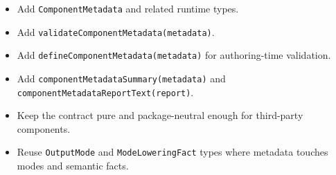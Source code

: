 \begin{itemize}
\tightlist
\item
  Add \texttt{C\allowbreak{}o\allowbreak{}m\allowbreak{}p\allowbreak{}o\allowbreak{}n\allowbreak{}e\allowbreak{}n\allowbreak{}t\allowbreak{}M\allowbreak{}e\allowbreak{}t\allowbreak{}a\allowbreak{}d\allowbreak{}a\allowbreak{}t\allowbreak{}a} and related runtime types.
\item
  Add \texttt{v\allowbreak{}a\allowbreak{}l\allowbreak{}i\allowbreak{}d\allowbreak{}a\allowbreak{}t\allowbreak{}e\allowbreak{}C\allowbreak{}o\allowbreak{}m\allowbreak{}p\allowbreak{}o\allowbreak{}n\allowbreak{}e\allowbreak{}n\allowbreak{}t\allowbreak{}M\allowbreak{}e\allowbreak{}t\allowbreak{}a\allowbreak{}d\allowbreak{}a\allowbreak{}t\allowbreak{}a\allowbreak{}(\allowbreak{}m\allowbreak{}e\allowbreak{}t\allowbreak{}a\allowbreak{}d\allowbreak{}a\allowbreak{}t\allowbreak{}a\allowbreak{})}.
\item
  Add \texttt{d\allowbreak{}e\allowbreak{}f\allowbreak{}i\allowbreak{}n\allowbreak{}e\allowbreak{}C\allowbreak{}o\allowbreak{}m\allowbreak{}p\allowbreak{}o\allowbreak{}n\allowbreak{}e\allowbreak{}n\allowbreak{}t\allowbreak{}M\allowbreak{}e\allowbreak{}t\allowbreak{}a\allowbreak{}d\allowbreak{}a\allowbreak{}t\allowbreak{}a\allowbreak{}(\allowbreak{}m\allowbreak{}e\allowbreak{}t\allowbreak{}a\allowbreak{}d\allowbreak{}a\allowbreak{}t\allowbreak{}a\allowbreak{})} for authoring-time validation.
\item
  Add \texttt{c\allowbreak{}o\allowbreak{}m\allowbreak{}p\allowbreak{}o\allowbreak{}n\allowbreak{}e\allowbreak{}n\allowbreak{}t\allowbreak{}M\allowbreak{}e\allowbreak{}t\allowbreak{}a\allowbreak{}d\allowbreak{}a\allowbreak{}t\allowbreak{}a\allowbreak{}S\allowbreak{}u\allowbreak{}m\allowbreak{}m\allowbreak{}a\allowbreak{}r\allowbreak{}y\allowbreak{}(\allowbreak{}m\allowbreak{}e\allowbreak{}t\allowbreak{}a\allowbreak{}d\allowbreak{}a\allowbreak{}t\allowbreak{}a\allowbreak{})} and \texttt{c\allowbreak{}o\allowbreak{}m\allowbreak{}p\allowbreak{}o\allowbreak{}n\allowbreak{}e\allowbreak{}n\allowbreak{}t\allowbreak{}M\allowbreak{}e\allowbreak{}t\allowbreak{}a\allowbreak{}d\allowbreak{}a\allowbreak{}t\allowbreak{}a\allowbreak{}R\allowbreak{}e\allowbreak{}p\allowbreak{}o\allowbreak{}r\allowbreak{}t\allowbreak{}T\allowbreak{}e\allowbreak{}x\allowbreak{}t\allowbreak{}(\allowbreak{}r\allowbreak{}e\allowbreak{}p\allowbreak{}o\allowbreak{}r\allowbreak{}t\allowbreak{})}.
\item
  Keep the contract pure and package-neutral enough for third-party components.
\item
  Reuse \texttt{O\allowbreak{}u\allowbreak{}t\allowbreak{}p\allowbreak{}u\allowbreak{}t\allowbreak{}M\allowbreak{}o\allowbreak{}d\allowbreak{}e} and \texttt{M\allowbreak{}o\allowbreak{}d\allowbreak{}e\allowbreak{}L\allowbreak{}o\allowbreak{}w\allowbreak{}e\allowbreak{}r\allowbreak{}i\allowbreak{}n\allowbreak{}g\allowbreak{}F\allowbreak{}a\allowbreak{}c\allowbreak{}t} types where metadata touches modes and semantic facts.
\end{itemize}

